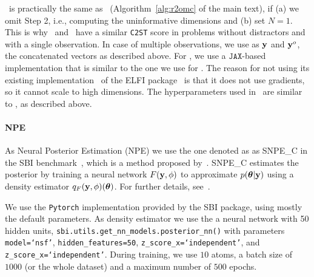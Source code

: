 \nromc~is practically the same as \rromc~(Algorithm~\ref{alg:r2omc} of the main text), if (a) we omit Step 2, i.e., computing the uninformative dimensions and (b) set $N=1$.
This is why \nromc~and \rromc~have a similar \texttt{C2ST} score in problems without distractors and with a single observation.
In case of multiple observations, we use as $\mathbf{y}$ and $\mathbf{y}^o$, the concatenated vectors as described above.
For \nromc, we use a $\texttt{JAX}$-based implementation that is similar to the one we use for \rromc. The reason for not using its existing implementation~\citep{gkolemis2023extendable} of the ELFI package~\citep{elfipackage} is that it does not use gradients, so it cannot scale to high dimensions.
The hyperparameters used in \nromc~are similar to \rromc, as described above. 

\paragraph{NPE}



As Neural Posterior Estimation (NPE) we use the one denoted as as SNPE\_C in the SBI benchmark~\citep{lueckmann2021benchmarking}, which is a method proposed by~\citet{greenberg2019automatic}.
SNPE\_C estimates the posterior by training a neural network \( F(\mathbf{y}, \phi) \) to approximate \( p(\boldsymbol{\theta}|\mathbf{y}) \) using a density estimator \( q_F(\mathbf{y}, \phi)(\boldsymbol{\theta}) \). For further details, see~\citep{greenberg2019automatic}.

We use the \texttt{Pytorch} implementation provided by the SBI package, using mostly the default parameters. As density estimator we use the a neural network with 50 hidden units,
\texttt{sbi.utils.get\_nn\_models.posterior\_nn()} with parameters 
\texttt{model=`nsf'},
\texttt{hidden\_features=50},
\texttt{z\_score\_x=`independent'}, and
\texttt{z\_score\_x=`independent'}.
During training, we use $10$ atoms, a batch size of $1000$ (or the whole dataset) and a maximum number of $500$ epochs.

